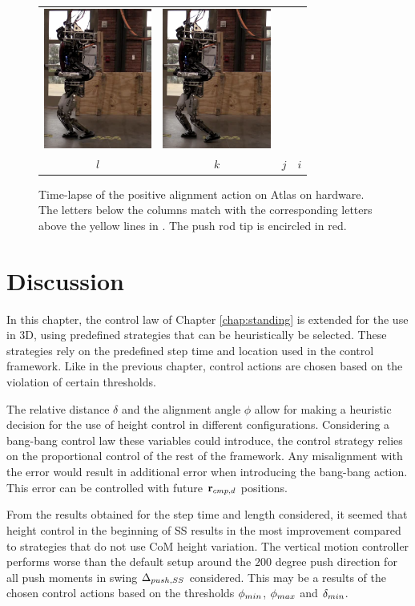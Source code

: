 \begin{figure}
\begin{tabular}{cccc}
    \includegraphics[width=1.4in]{STYLESTUFF/atw10} &
    \includegraphics[width=1.4in]{STYLESTUFF/atw9} \\
    $l$ & $k$ & $j$ & $i$ 
  \end{tabular}
  \caption{Time-lapse of the positive alignment action on Atlas on hardware. The letters below the columns match with the corresponding letters above the yellow lines in . The push rod tip is encircled in red.}
  \label{fig:atw}
\end{figure}
\section{Discussion}
In this chapter, the control law of Chapter \ref{chap:standing} is extended for the use in \ac{3D}, using predefined strategies that can be heuristically be selected. These strategies rely on the predefined step time and location used in the control framework. Like in the previous chapter, control actions are chosen based on the violation of certain thresholds. 

The relative distance $\delta$ and the alignment angle $\phi$ allow for making a heuristic decision for the use of height control in different configurations. Considering a bang-bang control law these variables could introduce, the control strategy relies on the proportional control of the rest of the framework. Any misalignment with the error would result in additional error when introducing the bang-bang action. This error can be controlled with future $\mathbf{r}_{cmp,d}$ positions.

From the results obtained for the step time and length considered, it seemed that height control in the beginning of \ac{SS} results in the most improvement compared to strategies that do not use \ac{CoM} height variation. The vertical motion controller performs worse than the default setup around the $200$ degree push direction for all push moments in swing $\Delta_{push,SS}$ considered. This may be a results of the chosen control actions based on the thresholds $\phi_{min}$, $\phi_{max}$ and $\delta_{min}$.

